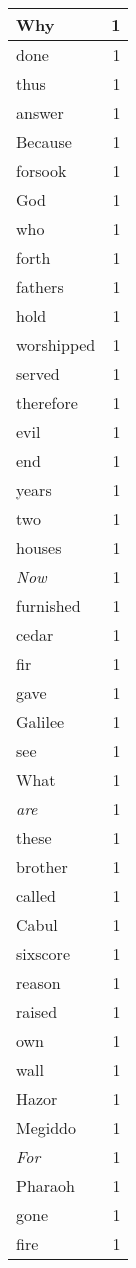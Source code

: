 \begin{center}
\begin{longtable}{l|r}
Why & 1 \\ \hline
done & 1 \\ \hline
thus & 1 \\ \hline
answer & 1 \\ \hline
Because & 1 \\ \hline
forsook & 1 \\ \hline
God & 1 \\ \hline
who & 1 \\ \hline
forth & 1 \\ \hline
fathers & 1 \\ \hline
hold & 1 \\ \hline
worshipped & 1 \\ \hline
served & 1 \\ \hline
therefore & 1 \\ \hline
evil & 1 \\ \hline
end & 1 \\ \hline
years & 1 \\ \hline
two & 1 \\ \hline
houses & 1 \\ \hline
\emph{Now} & 1 \\ \hline
furnished & 1 \\ \hline
cedar & 1 \\ \hline
fir & 1 \\ \hline
gave & 1 \\ \hline
Galilee & 1 \\ \hline
see & 1 \\ \hline
What & 1 \\ \hline
\emph{are} & 1 \\ \hline
these & 1 \\ \hline
brother & 1 \\ \hline
called & 1 \\ \hline
Cabul & 1 \\ \hline
sixscore & 1 \\ \hline
reason & 1 \\ \hline
raised & 1 \\ \hline
own & 1 \\ \hline
wall & 1 \\ \hline
Hazor & 1 \\ \hline
Megiddo & 1 \\ \hline
\emph{For} & 1 \\ \hline
Pharaoh & 1 \\ \hline
gone & 1 \\ \hline
fire & 1 \\ \hline

\end{longtable}
\end{center}
